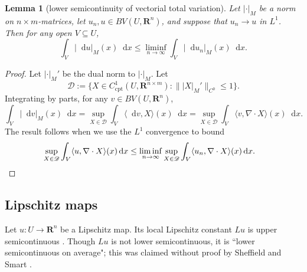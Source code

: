 \documentclass[reqno,11pt]{amsart}
\newcommand{\RR}{\mathbf{R}}
\newcommand*\dif{\mathop{}\!\mathrm{d}}
\newcommand{\cpt}{\mathrm{cpt}}
\newtheorem{lemma}[theorem]{Lemma}
\theoremstyle{definition}
\numberwithin{equation}{section}
\begin{document}
\begin{lemma}[lower semicontinuity of vectorial total variation]\label{TV lower semicontinuity}
Let $|\cdot|_M$ be a norm on $n \times m$-matrices, let $u_n, u \in BV(U, \RR^n)$, and suppose that $u_n \to u$ in $L^1$.
Then for any open $V \subseteq U$,
$$\int_V |\dif u|_M(x) \dif x \leq \liminf_{n \to \infty} \int_V |\dif u_n|_M(x) \dif x.$$
\end{lemma}
\begin{proof}
Let $|\cdot|_M'$ be the dual norm to $|\cdot|_M$.
Let
$$\mathscr D := \{X \in C^1_\cpt(U, \RR^{n \times m}): \||X|_M'\|_{C^0} \leq 1\}.$$
Integrating by parts, for any $v \in BV(U, \RR^n)$, 
$$\int_V |\dif v|_M(x) \dif x = \sup_{X \in \mathscr D} \int_V \langle \dif v, X\rangle(x) \dif x = \sup_{X \in \mathscr D} \int_V \langle v, \nabla \cdot X\rangle(x) \dif x.$$
The result follows when we use the $L^1$ convergence to bound
\begin{align*}
\sup_{X \in \mathscr D} \int_V \langle u, \nabla \cdot X\rangle(x) \dif x 
&\leq \liminf_{n \to \infty} \sup_{X \in \mathscr D} \int_V \langle u_n, \nabla \cdot X\rangle(x) \dif x. \qedhere
\end{align*}
\end{proof}

\subsection{Lipschitz maps}
Let $u: U \to \RR^n$ be a Lipschitz map.
Its local Lipschitz constant $Lu$ is upper semicontinuous \cite[Lemma 4.2(a)]{Crandall2008}.
Though $Lu$ is not lower semicontinuous, it is ``lower semicontinuous on average"; this was claimed without proof by Sheffield and Smart \cite[\S1.4]{Sheffield12}.
\end{document}
